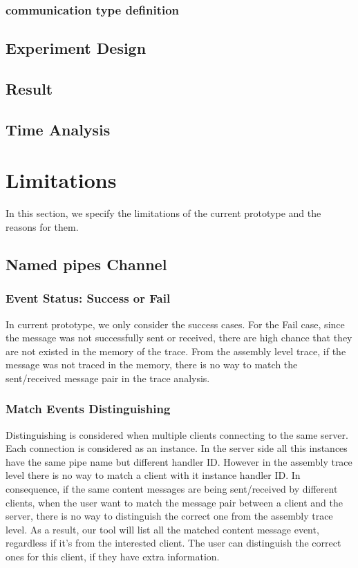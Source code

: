 \documentclass[paper=a4, fontsize=11pt]{scrartcl}
\numberwithin{equation}{section}		%
\numberwithin{figure}{section}			%
\numberwithin{table}{section}				%
\begin{document}
\subsubsection{communication type definition}

\subsection{Experiment Design}
\subsection{Result}
\subsection{Time Analysis}
\section{Limitations}
In this section, we specify the limitations of the current prototype and the reasons for them. 
\subsection{Named pipes Channel}
\subsubsection{Event Status: Success or Fail}
In current prototype, we only consider the success cases. For the Fail case, since the message was not successfully sent or received, there are high chance that they are not existed in the memory of the trace. From the assembly level trace, if the message was not traced in the memory, there is no way to match the sent/received message pair in the trace analysis.   
\subsubsection{Match Events Distinguishing}
Distinguishing is considered when multiple clients connecting to the same server. Each connection is considered as an instance. In the server side all this instances have the same pipe name but different handler ID. However in the assembly trace level there is no way to match a client with it instance handler ID. In consequence, if the same content messages are being sent/received by different clients, when the user want to match the message pair between a client and the server, there is no way to distinguish the correct one from the assembly trace level. As a result, our tool will list all the matched content message event, regardless if it's from the interested client. The user can distinguish the correct ones for this client, if they have extra information.
\end{document}
